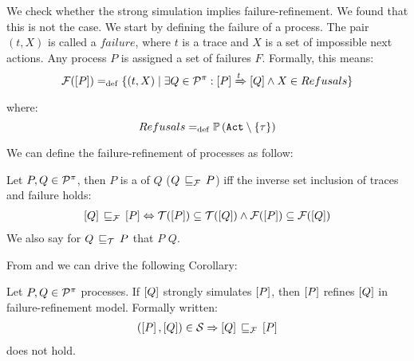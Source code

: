 We check whether the strong simulation implies failure-refinement. We found that this is not the case. We start by defining the failure of a process.
The pair $(t, X)$ is called a $failure$, where $t$ is a trace and $X$ is a set of impossible next actions. Any process
$P$ is assigned a set of failures $F$. Formally, this means:
\begin{align}
    \failures[P] \define \{(t,X) \mid \exists Q\in\procs: \ec{P} \bigstep{t} \ec{Q}\wedge X\in Refusals\}
\label{failure}
\end{align}
where: \[Refusals \define \pom{\actions\setminus\set{\tau}}\]

We can define the failure-refinement of \picalc{} processes as follow:

\begin{definition}
\label{def_failure_ref}
	Let $P,Q\in\mathcal P^{\pi}$, then $P$ is a  of $Q$ ($Q\refiF P$) iff the inverse set inclusion of traces and failure holds:
\begin{align}
   \ec{Q} \refiF \ec{P} \Leftrightarrow  \traces[P]\subseteq\traces[Q] \wedge \failures[P]\subseteq\failures[Q]
\end{align}
	We also say for $Q\refi{}P$ that $P$  $Q$.
\end{definition}

From  and  we can drive the following Corollary: 

\begin{cor}
\label{cor_sim_failure_refinement}
Let $P,Q\in\mathcal P^{\pi}$ processes. If $\left[Q\right]$ strongly simulates $\left[P\right]$, then $\left[P\right]$ refines $\left[Q\right]$ in failure-refinement model. Formally written:
\begin{align}
    (\ec{P},\ec{Q})\in{}\simu  \Rightarrow \ec{Q} \refiF \ec{P}
   \label{failure_model}
\end{align}
does not hold.
\end{cor}%

